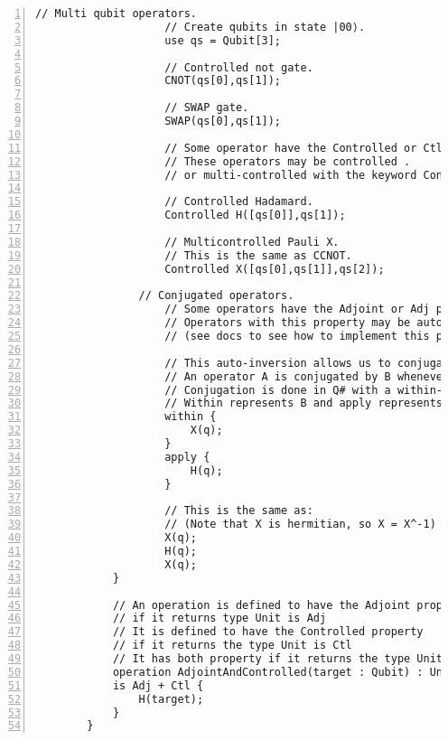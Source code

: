 \documentclass[
10pt, %
a4  paper, %
twoside, %
headinclude,footinclude, %
BCOR=5mm, %
]{scrartcl}
\begin{document}
\begin{Verbatim}[gobble=2, numbers=left, frame=lines,
        framesep=3mm,
        label={[Beginning of code]End of code}]
                // Multi qubit operators.
                    // Create qubits in state |00⟩.
                    use qs = Qubit[3];

                    // Controlled not gate.
                    CNOT(qs[0],qs[1]);

                    // SWAP gate.
                    SWAP(qs[0],qs[1]);

                    // Some operator have the Controlled or Ctl property.
                    // These operators may be controlled .
                    // or multi-controlled with the keyword Controll.

                    // Controlled Hadamard.
                    Controlled H([qs[0]],qs[1]);

                    // Multicontrolled Pauli X.
                    // This is the same as CCNOT.
                    Controlled X([qs[0],qs[1]],qs[2]);

                // Conjugated operators.
                    // Some operators have the Adjoint or Adj property.
                    // Operators with this property may be auto inverted .
                    // (see docs to see how to implement this property by hand)
                    
                    // This auto-inversion allows us to conjugate an operator.
                    // An operator A is conjugated by B whenever we do BAB^-1.
                    // Conjugation is done in Q# with a within-apply block.
                    // Within represents B and apply represents A.
                    within {
                        X(q);
                    }
                    apply {
                        H(q);
                    }

                    // This is the same as:
                    // (Note that X is hermitian, so X = X^-1)
                    X(q);
                    H(q);
                    X(q);
            }

            // An operation is defined to have the Adjoint property
            // if it returns type Unit is Adj
            // It is defined to have the Controlled property
            // if it returns the type Unit is Ctl
            // It has both property if it returns the type Unit is Adj + Ctl
            operation AdjointAndControlled(target : Qubit) : Unit
            is Adj + Ctl {
                H(target);
            }
        }
    \end{Verbatim}
\end{document}
